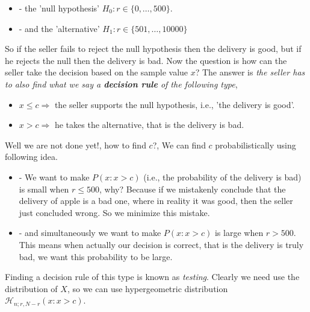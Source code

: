 \documentclass[ 11pt,%
				a4paper,%
				twoside,%
				headinclude,%
				footinclude = true,%
				cleardoublepage = empty,%
				reqno]{scrbook}
\begin{document}
\begin{example}
    \begin{itemize}
        \item[] - the 'null hypothesis' $H_{0}: r \in\{0, \ldots, 500\}$.

        \item[] - and the 'alternative' $H_{1}: r \in\{501, \ldots, 10000\}$
    \end{itemize}

So if the seller fails to reject the null hypothesis then the delivery is good, but if he rejects the null then the delivery is bad. Now the question is how can the seller take the decision based on the sample value $x$? The answer is \emph{the seller has to also find what we say a \textbf{decision rule} of the following type},

\begin{itemize}
    \item $x \leq c \Rightarrow$ the seller supports the null hypothesis, i.e., 'the delivery is good'.

    \item $x>c \Rightarrow$ he takes the alternative, that is the delivery is bad.
\end{itemize}

    
Well we are not done yet!, how to find $c$?, We can find $c$ probabilistically using following idea.

\begin{itemize}
  \item[]  - We want to make $P(x: x>c)$ (i.e., the probability of the delivery is bad) is small when $r \leq 500$, why? Because  if we mistakenly conclude that the delivery of apple is a bad one, where in reality it was good, then the seller just concluded wrong. So we minimize this mistake.

  \item[] - and simultaneously we want to make $P( x : x > c )$ is large when $r > 500$. This means when actually our decision is correct, that is the delivery is truly bad, we want this probability to be large.
\end{itemize}

Finding a decision rule of this type is known as \emph{testing}. Clearly we need use the distribution of $X$, so we can use hypergeometric distribution $\mathcal{H}_{n ; r, N-r}(x: x>c)$.






\end{example}
\end{document}
